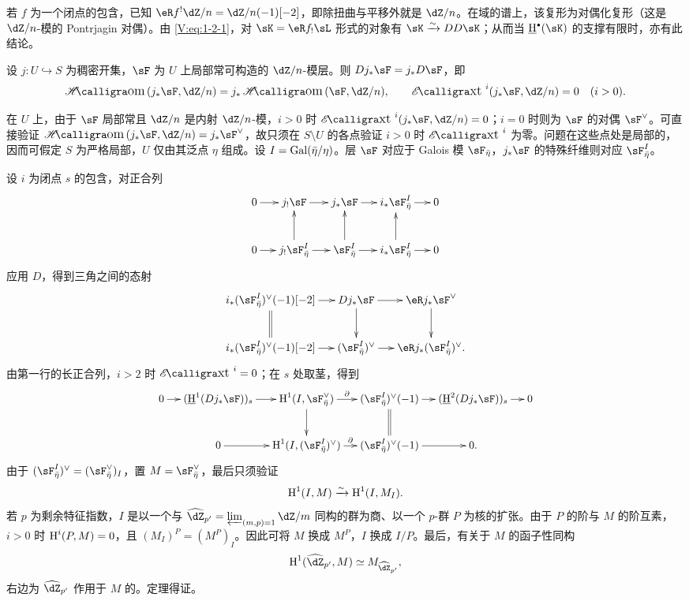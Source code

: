 若 $f$ 为一个闭点的包含，已知 $\eR f^!\dZ/n=\dZ/n(-1)[-2]$，即除扭曲与平移外就是 $\dZ/n$。在域的谱上，该复形为对偶化复形（这是 $\dZ/n$-模的 Pontrjagin 对偶）。由 \eqref{V:eq:1-2-1}，对 $\sK=\eR f_!\sL$ 形式的对象有 $\sK\iso DD\sK$；从而当 $\underline\h^\bullet(\sK)$ 的支撑有限时，亦有此结论。

\begin{theorem_}\label{V:1-3}
设 $j:U\hookrightarrow S$ 为稠密开集，$\sF$ 为 $U$ 上局部常可构造的 $\dZ/n$-模层。则 $Dj_*\sF=j_*D\sF$，即
\[
\Hom(j_*\sF,\dZ/n)=j_*\Hom(\sF,\dZ/n),\qquad
\Ext^i(j_*\sF,\dZ/n)=0\quad(i>0).
\]
\end{theorem_}
在 $U$ 上，由于 $\sF$ 局部常且 $\dZ/n$ 是内射 $\dZ/n$-模，$i>0$ 时 $\Ext^i(j_*\sF,\dZ/n)=0$；$i=0$ 时则为 $\sF$ 的对偶 $\sF^\vee$。可直接验证 $\Hom(j_*\sF,\dZ/n)=j_*\sF^\vee$，故只须在 $S\setminus U$ 的各点验证 $i>0$ 时 $\Ext^i$ 为零。问题在这些点处是局部的，因而可假定 $S$ 为严格局部，$U$ 仅由其泛点 $\eta$ 组成。设 $I=\operatorname{Gal}(\bar\eta/\eta)$。层 $\sF$ 对应于 Galois 模 $\sF_{\bar\eta}$，$j_*\sF$ 的特殊纤维则对应 $\sF_{\bar\eta}^I$。

设 $i$ 为闭点 $s$ 的包含，对正合列
\[\xymatrix@C=14pt{
0\ar[r]&j_!\sF\ar[r]&j_*\sF\ar[r]&i_*\sF_{\bar\eta}^I\ar[r]&0\\
0\ar[r]&j_!\sF_{\bar\eta}^I\ar[r]\ar[u]&\sF_{\bar\eta}^I\ar[r]\ar[u]&i_*\sF_{\bar\eta}^I\ar[r]\ar[u]&0
}\]
应用 $D$，得到三角之间的态射
\[\xymatrix@C=14pt{
i_*(\sF_{\bar\eta}^I)^\vee(-1)[-2]\ar[r]\ar@{=}[d]&Dj_*\sF\ar[r]\ar[d]&\eR j_*\sF^\vee\ar[d]\\
i_*(\sF_{\bar\eta}^I)^\vee(-1)[-2]\ar[r]&(\sF_{\bar\eta}^I)^\vee\ar[r]&\eR j_*(\sF_{\bar\eta}^I)^\vee.
}\]
由第一行的长正合列，$i>2$ 时 $\Ext^i=0$；在 $s$ 处取茎，得到
\[
\resizebox{\linewidth}{!}{$\xymatrix@C=12pt{
0\ar[r]&(\underline\h^1(Dj_*\sF))_s\ar[r]&\h^1(I,\sF_{\bar\eta}^\vee)\ar[r]^-\partial\ar[d]&(\sF_{\bar\eta}^I)^\vee(-1)\ar[r]\ar@{=}[d]&(\underline\h^2(Dj_*\sF))_s\ar[r]&0\\
&0\ar[r]&\h^1(I,(\sF_{\bar\eta}^I)^\vee)\ar[r]^-\partial&(\sF_{\bar\eta}^I)^\vee(-1)\ar[r]&0.
}$}
\]
由于 $(\sF_{\bar\eta}^I)^\vee=(\sF_{\bar\eta}^\vee)_I$，置 $M=\sF_{\bar\eta}^\vee$，最后只须验证
\[
\operatorname{H}^1(I,M)\xrightarrow\sim\operatorname{H}^1(I,M_I).
\]
若 $p$ 为剩余特征指数，$I$ 是以一个与 $\widehat\dZ_{p'}=\varprojlim_{(m,p)=1}\dZ/m$ 同构的群为商、以一个 $p$-群 $P$ 为核的扩张。由于 $P$ 的阶与 $M$ 的阶互素，$i>0$ 时 $\operatorname{H}^i(P,M)=0$，且 $(M_I)^P=(M^P)_I$。因此可将 $M$ 换成 $M^P$，$I$ 换成 $I/P$。最后，有关于 $M$ 的函子性同构
\[
\h^1(\widehat\dZ_{p'},M)\simeq M_{\widehat\dZ_{p'}},
\]
右边为 $\widehat\dZ_{p'}$ 作用于 $M$ 的。定理得证。

